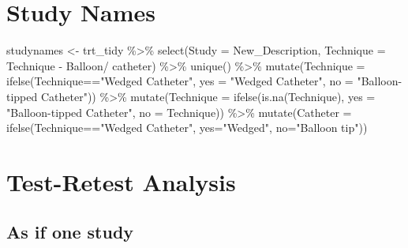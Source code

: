 \documentclass[
]{article}
\newenvironment{Shaded}{\begin{snugshade}}{\end{snugshade}}
\newcommand{\AttributeTok}[1]{\textcolor[rgb]{0.77,0.63,0.00}{#1}}
\newcommand{\FunctionTok}[1]{\textcolor[rgb]{0.00,0.00,0.00}{#1}}
\newcommand{\NormalTok}[1]{#1}
\newcommand{\OtherTok}[1]{\textcolor[rgb]{0.56,0.35,0.01}{#1}}
\newcommand{\SpecialCharTok}[1]{\textcolor[rgb]{0.00,0.00,0.00}{#1}}
\newcommand{\StringTok}[1]{\textcolor[rgb]{0.31,0.60,0.02}{#1}}
\begin{document}
\hypertarget{study-names}{%
\section{Study Names}\label{study-names}}

\begin{Shaded}
\begin{Highlighting}[]
\NormalTok{studynames }\OtherTok{\textless{}{-}}\NormalTok{ trt\_tidy }\SpecialCharTok{\%\textgreater{}\%} 
  \FunctionTok{select}\NormalTok{(}\AttributeTok{Study =}\NormalTok{ New\_Description, }
         \AttributeTok{Technique =} \StringTok{\textasciigrave{}}\AttributeTok{Technique {-} Balloon/ catheter}\StringTok{\textasciigrave{}}\NormalTok{) }\SpecialCharTok{\%\textgreater{}\%} 
  \FunctionTok{unique}\NormalTok{() }\SpecialCharTok{\%\textgreater{}\%} 
  \FunctionTok{mutate}\NormalTok{(}\AttributeTok{Technique =} \FunctionTok{ifelse}\NormalTok{(Technique}\SpecialCharTok{==}\StringTok{"Wedged Catheter"}\NormalTok{,}
                            \AttributeTok{yes =} \StringTok{"Wedged Catheter"}\NormalTok{,}
                            \AttributeTok{no =} \StringTok{"Balloon{-}tipped Catheter"}\NormalTok{)) }\SpecialCharTok{\%\textgreater{}\%} 
  \FunctionTok{mutate}\NormalTok{(}\AttributeTok{Technique =} \FunctionTok{ifelse}\NormalTok{(}\FunctionTok{is.na}\NormalTok{(Technique),}
                            \AttributeTok{yes =} \StringTok{"Balloon{-}tipped Catheter"}\NormalTok{,}
                            \AttributeTok{no =}\NormalTok{ Technique)) }\SpecialCharTok{\%\textgreater{}\%} 
  \FunctionTok{mutate}\NormalTok{(}\AttributeTok{Catheter =} \FunctionTok{ifelse}\NormalTok{(Technique}\SpecialCharTok{==}\StringTok{"Wedged Catheter"}\NormalTok{,}
                           \AttributeTok{yes=}\StringTok{"Wedged"}\NormalTok{, }\AttributeTok{no=}\StringTok{"Balloon tip"}\NormalTok{))}
\end{Highlighting}
\end{Shaded}

\hypertarget{test-retest-analysis}{%
\section{Test-Retest Analysis}\label{test-retest-analysis}}

\hypertarget{as-if-one-study}{%
\subsection{As if one study}\label{as-if-one-study}}
\end{document}
